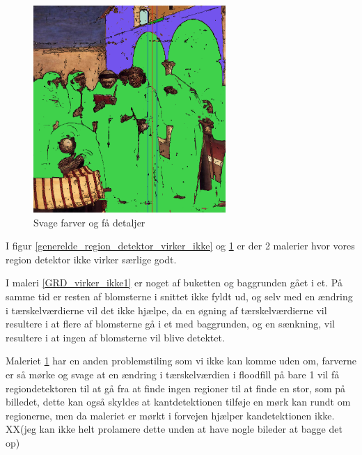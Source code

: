 \begin{figure}[!h]
	\begin{center}
	    \includegraphics[angle=0,width=0.65\textwidth]{afsnit/afprovning/billeder/thressholds/svage_farver/svage_detalier/floodfill/4-4.png}
	\end{center}    
	\caption{Svage farver og få detaljer}
    \label{GRD_virker_ikke2}
\end{figure}

I figur \ref{generelde_region_detektor_virker_ikke} og
\ref{GRD_virker_ikke2} er der 2 malerier hvor
vores region detektor ikke virker særlige godt. 

I maleri \ref{GRD_virker_ikke1} er noget af buketten og baggrunden gået
i et. På samme tid er resten af blomsterne i snittet ikke fyldt ud, og
selv med en ændring i tærskelværdierne vil det ikke hjælpe, da en øgning
af tærskelværdierne vil resultere i at flere af blomsterne gå i et med
baggrunden, og en sænkning, vil resultere i at ingen af blomsterne vil
blive detektet. 

Maleriet \ref{GRD_virker_ikke2} har en anden problemstiling som vi ikke
kan komme uden om, farverne er så mørke og svage at en ændring i
tærskelværdien i floodfill på bare 1 vil få regiondetektoren til at gå
fra at finde ingen regioner til at finde en stor, som på billedet, dette
kan også skyldes at kantdetektionen tilføje en mørk kan rundt om
regionerne, men da maleriet er mørkt i forvejen hjælper kandetektionen
ikke. XX(jeg kan ikke helt prolamere dette unden at have nogle bileder
at bagge det op)

